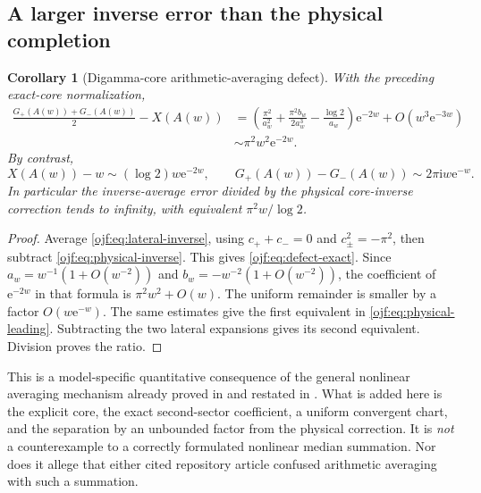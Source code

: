 \documentclass[11pt,a4paper]{article}
\numberwithin{equation}{section}
\newtheorem{corollary}[theorem]{Corollary}
\theoremstyle{definition}\newtheorem{definition}[theorem]{Definition}
\theoremstyle{remark}\newtheorem{remark}[theorem]{Remark}
\newcommand{\ee}{\mathrm e}\newcommand{\ii}{\mathrm i}\newcommand{\dd}{\,\mathrm d}
\begin{document}
\subsection{A larger inverse error than the physical completion}

\begin{corollary}[Digamma-core arithmetic-averaging defect]
\label{ojf:cor:defect}
With the preceding exact-core normalization,
\begin{align}
 \frac{G_+(A(w))+G_-(A(w))}{2}-X(A(w))
 &=\left(\frac{\pi^2}{a_w^2}
       +\frac{\pi^2b_w}{2a_w^3}-\frac{\log2}{a_w}\right)\ee^{-2w}
             +O(w^3\ee^{-3w})                         \label{ojf:eq:defect-exact}\\
 &\sim\pi^2w^2\ee^{-2w}.                              \label{ojf:eq:defect-leading}
\end{align}
By contrast,
\begin{equation}\label{ojf:eq:physical-leading}
 X(A(w))-w\sim(\log2)w\ee^{-2w},
 \qquad
 G_+(A(w))-G_-(A(w))\sim2\pi\ii w\ee^{-w}.
\end{equation}
In particular the inverse-average error divided by the physical
core-inverse correction tends to infinity, with equivalent
$\pi^2w/\log2$.
\end{corollary}
\begin{proof}
Average \eqref{ojf:eq:lateral-inverse}, using
$c_++c_-=0$ and $c_\pm^2=-\pi^2$, then subtract
\eqref{ojf:eq:physical-inverse}. This gives
\eqref{ojf:eq:defect-exact}. Since
$a_w=w^{-1}(1+O(w^{-2}))$ and
$b_w=-w^{-2}(1+O(w^{-2}))$, the coefficient of $\ee^{-2w}$ in that
formula is $\pi^2w^2+O(w)$.
The uniform remainder is smaller by a factor $O(w\ee^{-w})$.
The same estimates give the first equivalent in
\eqref{ojf:eq:physical-leading}. Subtracting the two lateral
expansions gives its second equivalent. Division proves the ratio.
\end{proof}

This is a model-specific quantitative consequence of the general
nonlinear averaging mechanism already proved in \cite{RepoTransport}
and restated in \cite{RepoResonant}. What is added here is the explicit
core, the exact second-sector coefficient, a uniform convergent chart,
and the separation by an unbounded factor from the physical correction.
It is \emph{not} a counterexample to a correctly formulated nonlinear
median summation. Nor does it allege that either cited repository article
confused arithmetic averaging with such a summation.
\end{document}
